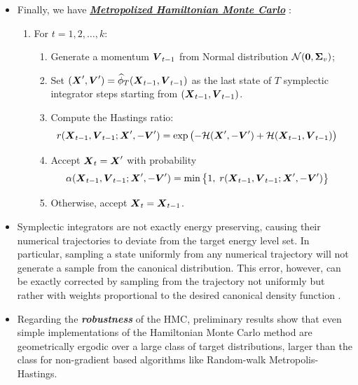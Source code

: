 \documentclass[11pt]{article}
\begin{document}
\begin{itemize}
\item Finally, we have \underline{\emph{\textbf{Metropolized Hamiltonian Monte Carlo}}} \citep{brooks2011handbook, betancourt2017conceptual}:
\begin{enumerate}
\item For $t=1,2,\ldots, k$:
\begin{enumerate}
\item Generate a momentum $\boldsymbol{V}_{t-1}$ from Normal distribution ${\mathcal N}(\boldsymbol{0}, \boldsymbol{\Sigma}_{v})$;
\item Set $(\boldsymbol{X}', \boldsymbol{V}') = \widehat{\phi}_{T}(\boldsymbol{X}_{t-1}, \boldsymbol{V}_{t-1})$ as the last state of $T$ symplectic integrator steps starting from 
$(\boldsymbol{X}_{t-1}, \boldsymbol{V}_{t-1})$. 

\item Compute the Hastings ratio:
\begin{align*}
r(\boldsymbol{X}_{t-1}, \boldsymbol{V}_{t-1}; \boldsymbol{X}', -\boldsymbol{V}') &= \exp\left(-{\mathcal H}(\boldsymbol{X}', -\boldsymbol{V}') + {\mathcal H}(\boldsymbol{X}_{t-1}, \boldsymbol{V}_{t-1})\right)
\end{align*}

\item Accept $\boldsymbol{X}_{t} = \boldsymbol{X}'$ with probability 
\begin{align*}
\alpha(\boldsymbol{X}_{t-1}, \boldsymbol{V}_{t-1}; \boldsymbol{X}', -\boldsymbol{V}') &= \min\left\{1,\;r(\boldsymbol{X}_{t-1}, \boldsymbol{V}_{t-1}; \boldsymbol{X}', -\boldsymbol{V}')\right\}
\end{align*}

\item Otherwise, accept $\boldsymbol{X}_{t} = \boldsymbol{X}_{t-1}$.
\end{enumerate}
\end{enumerate}

\item Symplectic integrators are not exactly energy preserving, causing their numerical trajectories to deviate from the target energy level set. In particular, sampling a state uniformly from any numerical trajectory will not generate a sample from the canonical distribution. This error, however, can be exactly corrected by sampling from the trajectory not uniformly but rather with weights proportional to the desired canonical density function \citep{betancourt2017conceptual}.

\item Regarding the \emph{\textbf{robustness}} of the HMC, preliminary results show that even simple implementations of the Hamiltonian Monte Carlo method are geometrically ergodic over a large class of target distributions, larger than the class for non-gradient based algorithms like Random-walk Metropolis-Hastings.


\end{itemize}
\end{document}
